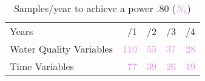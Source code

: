 \begin{table}
\caption{Samples/year to achieve a power .80 (\textcolor{violet}{$N_b$})}
\begin{center}
\begin{tabular}{lrrrr}
\toprule
Years & /1 & /2 & /3 & /4 \\ \cline{2-5}\noalign{\smallskip}
Water Quality Variables & \textcolor{violet}{110} & \textcolor{violet}{55} & \textcolor{violet}{37} & \textcolor{violet}{28} \\ 
Time Variables & \textcolor{violet}{77} & \textcolor{violet}{39}  & \textcolor{violet}{26}  & \textcolor{violet}{19}  \\ \bottomrule
\end{tabular}
\end{center}
\end{table}